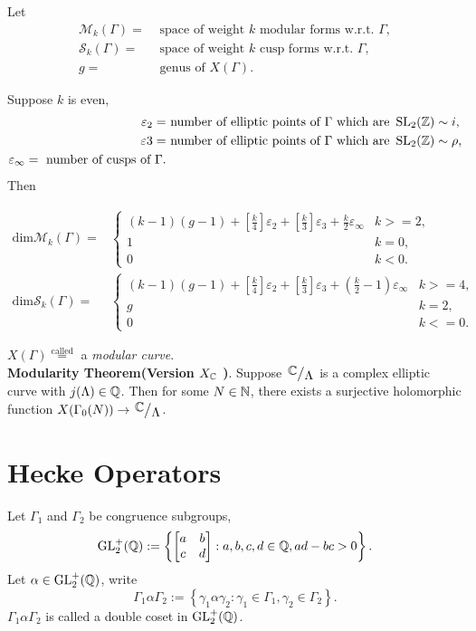 Let 
\begin{align*}
  \mathcal{M}_k(\Gamma)=&\text{ space of weight }k  \text{ modular forms w.r.t. }\Gamma,\\
  \mathcal{S}_k(\Gamma)=&\text{ space of weight }k \text{ cusp forms w.r.t. }\Gamma,\\
  g=&\text{ genus of }X(\Gamma)
.\end{align*}
\begin{theorem}
  Suppose $k$ is even,
  \begin{align*}
    \varepsilon _2=& \text{ number of elliptic points of }\Gamma \text{ which are }\operatorname{SL}_2(\mathbb{Z})\sim i,\\
    \varepsilon 3=& \text{ number of elliptic points of }\Gamma \text{ which are }\operatorname{SL}_2(\mathbb{Z})\sim\rho,\\
    \varepsilon _{\infty}= \text{ number of cusps of }\Gamma
  .\end{align*}
  Then

  \begin{align*}
    \mathrm{dim}\mathcal{M}_k(\Gamma)=&\begin{cases}
      (k-1)(g-1)+\left[ \frac{k}{4} \right] \varepsilon_2+\left[ \frac{k}{3} \right] \varepsilon _3+\frac{k}{2}\varepsilon _{\infty} & k>=2,\\
      1&k=0,\\
      0&k<0.
    \end{cases}\\
      \mathrm{dim}\mathcal{S}_k(\Gamma)=& \begin{cases}
	(k-1)(g-1)+\left[ \frac{k}{4} \right] \varepsilon _2+\left[ \frac{k}{3} \right] \varepsilon _3+\left( \frac{k}{2}-1 \right) \varepsilon _{\infty}&k>=4,\\
	g&k=2,\\
	0&k<=0.
      \end{cases}
  \end{align*}
\end{theorem}

$X(\Gamma)\overset{\text{called}}{=}$ a \textit{modular curve}.\\
\textbf{Modularity Theorem(Version $X_{\mathbb{C}}$ )}. Suppose $\sfrac{\C}{\Lambda}$ is a complex elliptic curve with $j(\Lambda)\in \mathbb{Q}$. Then for some $N \in \mathbb{N}$, there exists a surjective holomorphic function $X(\Gamma_0(N))\to \sfrac{\C}{\Lambda}$.

\section{Hecke Operators}
Let $\Gamma_1$ and $\Gamma_2$ be congruence subgroups,
\[
  \operatorname{GL}_2^{+}(\mathbb{Q}):=\left\{\begin{bmatrix} a&b\\c&d \end{bmatrix} :a,b,c,d\in \mathbb{Q},ad-bc>0\right\}.	
\] 
Let $\alpha \in \operatorname{GL}_2^{+}(\mathbb{Q})$, write 
\[
\Gamma_1\alpha\Gamma_2:=\left\{\gamma_1\alpha\gamma_2:\gamma_1\in \Gamma_1,\gamma_2\in \Gamma_2\right\}. 
\] 
$\Gamma_1\alpha\Gamma_2$ is called a double coset in $\operatorname{GL}_2^{+}(\mathbb{Q})$.

